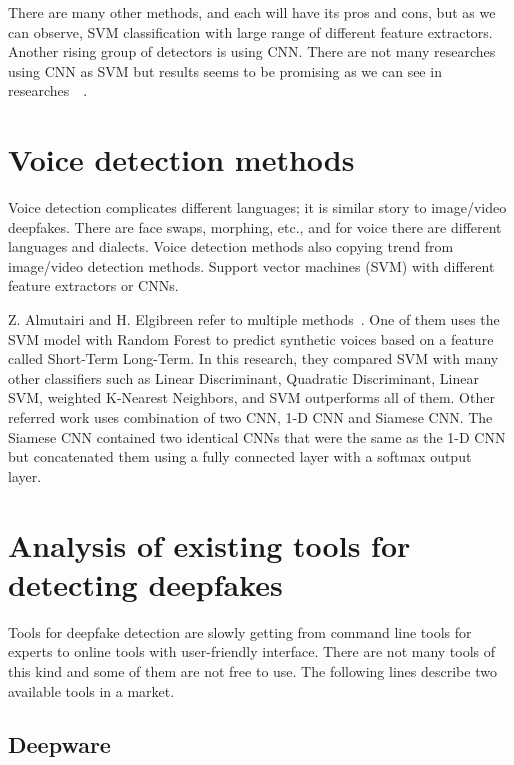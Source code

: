 There are many other methods, and each will have its pros and cons, but as we can observe, SVM classification with large range of different feature extractors. Another rising group of detectors is using CNN. There are not many researches using CNN as SVM but results seems to be promising as we can see in researches~\cite{3DCNNArchitecturesAndAttentionMechanismsForDeepfakeDetection}~\cite{CapsuleForensicsNetworksForDeepfakeDetection}.

\section{Voice detection methods}

Voice detection complicates different languages; it is similar story to image/video deepfakes. There are face swaps, morphing, etc., and for voice there are different languages and dialects. Voice detection methods also copying trend from image/video detection methods. Support vector machines (SVM) with different feature extractors or CNNs.

Z. Almutairi and H. Elgibreen refer to multiple methods~\cite{ReviewOfModernAudioDeepfakeDetectionMethods}. One of them uses the SVM model with Random Forest to predict synthetic voices based on a feature called Short-Term Long-Term. In this research, they compared SVM with many other classifiers such as Linear Discriminant, Quadratic Discriminant, Linear SVM, weighted K-Nearest Neighbors, and SVM outperforms all of them. Other referred work uses combination of two CNN, 1-D CNN and Siamese CNN. The Siamese CNN contained two identical CNNs that were the same as the 1-D CNN but concatenated them using a fully connected layer with a softmax output layer.~\cite{ReviewOfModernAudioDeepfakeDetectionMethods}

\section{Analysis of existing tools for detecting deepfakes}

Tools for deepfake detection are slowly getting from command line tools for experts to online tools with user-friendly interface. There are not many tools of this kind and some of them are not free to use. The following lines describe two available tools in a market.

\subsection{Deepware}

